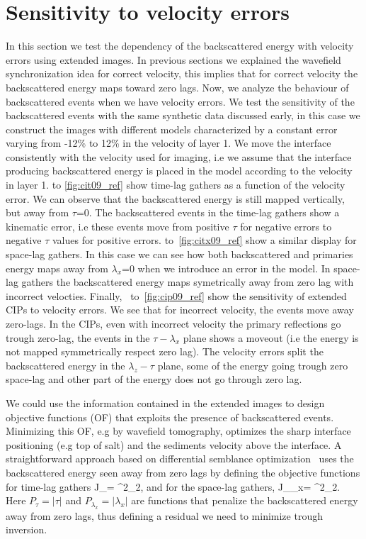 \section{Sensitivity to velocity errors}
In this section we test the dependency of the backscattered energy with velocity errors using extended images. In previous sections 
we explained the wavefield synchronization idea for correct velocity, this implies that for correct velocity the backscattered energy maps 
toward zero lags. Now, we analyze the behaviour of backscattered events when we have velocity errors.
We test the sensitivity of the backscattered events with the same synthetic data discussed early, in this case we construct the images
with different models characterized by a constant error varying from -12\% to 12\% in the velocity of layer 1. We move the interface 
consistently with the velocity used for imaging, i.e we assume that the interface producing backscattered energy is placed in the model
according to the velocity in layer 1.
 to \ref{fig:cit09_ref} show time-lag gathers as a function of the velocity error.
 We can observe that the backscattered energy is still mapped vertically, but
away from $\tau$=$0$. The backscattered events in the time-lag gathers show a kinematic error, i.e these events move from positive $\tau$
for negative errors to negative $\tau$ values for positive errors. 
%
 to~\ref{fig:citx09_ref} show a similar display for space-lag gathers. 
In this case we can see how both backscattered and primaries energy maps away from $\lambda_x$=$0$ when we introduce an error in the model. 
 In space-lag gathers the backscattered energy maps symetrically away from zero lag with incorrect velocties. 
%
Finally,~ to~\ref{fig:cip09_ref} show the sensitivity of extended CIPs to velocity errors. We see that for incorrect velocity, the events
move away zero-lags. In the CIPs, even with incorrect velocity the primary reflections go trough zero-lag, the events in the $\tau-\lambda_x$ plane shows a
moveout (i.e the energy is not mapped symmetrically respect zero lag). 
The velocity errors split the backscattered energy in the $\lambda_z-\tau$ plane, some of the energy going trough zero space-lag and other part
of the energy does not go through zero lag.

We could use the information contained in the extended images to design objective functions (OF) that exploits the presence of backscattered events. 
Minimizing this OF, e.g by wavefield tomography, optimizes the sharp interface positioning (e.g top of salt) and the sediments velocity above the interface.
A straightforward approach based on differential semblance optimization~\citep{shen:2132} uses
 the backscattered energy seen away from zero lags by defining the objective functions for time-lag gathers
\beq
 J_{\tau}=  ^2_2,
\label{eq:of1}
\eeq 
and for the space-lag gathers,
\beq
 J_{\lambda_x}=  ^2_2.
\label{eq:of2}
\eeq 
%
Here $P_{\tau}=|\tau|$ and $P_{\lambda_x}=|\lambda_x|$ are functions that penalize the backscattered energy away 
from zero lags, thus defining a residual we need to minimize trough inversion.

